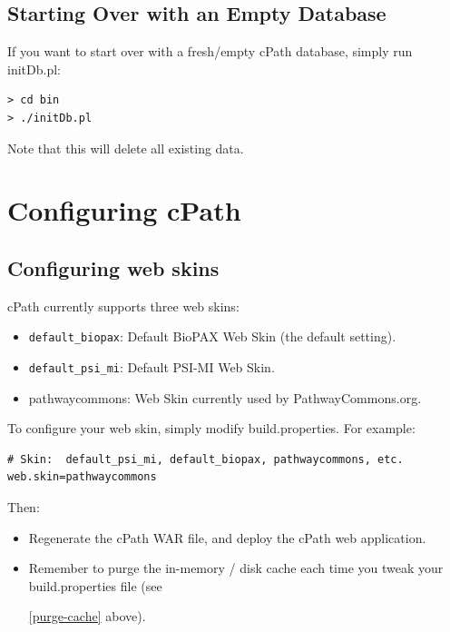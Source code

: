\documentclass[letterpaper,12pt]{article}
\begin{document}
\subsection{Starting Over with an Empty Database}

If you want to start over with a fresh/empty cPath database, simply run initDb.pl:

\begin{verbatim}
> cd bin
> ./initDb.pl
\end{verbatim}

Note that this will delete all existing data.

\section{Configuring cPath}

\subsection{Configuring web skins}

cPath currently supports three web skins:

\begin{itemize}

\item \verb+default_biopax+:  Default BioPAX Web Skin (the default setting).

\item \verb+default_psi_mi+:  Default PSI-MI Web Skin.

\item pathwaycommons:  Web Skin currently used by PathwayCommons.org.
\end{itemize}

To configure your web skin, simply modify build.properties.  For example:

\begin{verbatim}
# Skin:  default_psi_mi, default_biopax, pathwaycommons, etc.
web.skin=pathwaycommons
\end{verbatim}

Then:

\begin{itemize}

\item Regenerate the cPath WAR file, and deploy the cPath web application.

\item Remember to purge the in-memory / disk cache each time you tweak your build.properties file (see

\ref{purge-cache} above).
\end{itemize}
\end{document}
